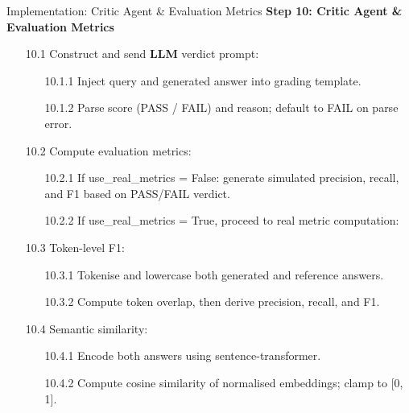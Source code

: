 \begin{frame}{Implementation: Critic Agent \& Evaluation Metrics}
\textbf{Step 10: Critic Agent \& Evaluation Metrics}
    \begin{itemize}
        \item [10.1] Construct and send \textbf{LLM} verdict prompt:
        \begin{itemize}
            \item[10.1.1] Inject query and generated answer into grading template.
            \item[10.1.2] Parse score (PASS / FAIL) and reason; default to FAIL on parse error.
        \end{itemize}

        \item[10.2] Compute evaluation metrics:
        \begin{itemize}
            \item [10.2.1] If use\_real\_metrics = False: generate simulated precision, recall, and F1 based on PASS/FAIL verdict.
            \item[10.2.2] If use\_real\_metrics = True, proceed to real metric computation: 
        \end{itemize}

        \item[10.3] Token-level F1: 
        \begin{itemize}
            \item [10.3.1] Tokenise and lowercase both generated and reference answers.
            \item[10.3.2] Compute token overlap, then derive precision, recall, and F1.
        \end{itemize}

        \item[10.4] Semantic similarity:
        \begin{itemize}
            \item [10.4.1] Encode both answers using sentence-transformer.
            \item[10.4.2] Compute cosine similarity of normalised embeddings; clamp to [0, 1]. 
        \end{itemize}

        
    \end{itemize}
\end{frame}

